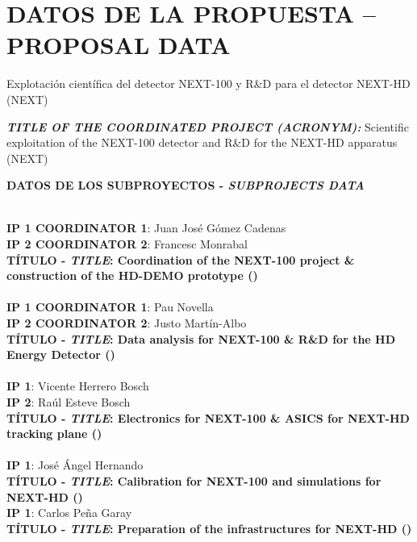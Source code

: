 \documentclass[a4paper,11pt,oneside, english]{article}
\begin{document}
	\section{\small DATOS DE LA PROPUESTA -- PROPOSAL DATA}
	\begin{tcolorbox}[colback=white,arc=0pt,outer arc=0pt,colframe=black,boxrule=0.6pt,left=0mm,right=0mm]
 Explotación científica del detector NEXT-100 y R\&D para el detector NEXT-HD (NEXT) 
\end{tcolorbox}
{\bf \emph{TITLE OF THE COORDINATED PROJECT (ACRONYM):}} Scientific exploitation of the NEXT-100 detector and R\&D for the NEXT-HD apparatus (NEXT)
\vspace{3pt}
\begin{tcolorbox}[colback=white,arc=0pt,outer arc=0pt,colframe=black,boxrule=0.6pt,left=0mm]
  \textbf{DATOS DE LOS SUBPROYECTOS - \emph{SUBPROJECTS DATA}}
\end{tcolorbox}
\\
{\bf IP 1 COORDINATOR 1}: Juan Jos\'e G\'omez Cadenas\\
{\bf IP 2 COORDINATOR 2}: Francesc Monrabal\\
{\bf T\'ITULO - \emph{TITLE}: Coordination of the NEXT-100 project \& construction of the HD-DEMO prototype (\sDIPC)}\\
\\
{\bf IP 1 COORDINATOR 1}: Pau Novella\\
{\bf IP 2 COORDINATOR 2}: Justo Mart\'in-Albo\\
{\bf T\'ITULO - \emph{TITLE}: Data analysis for NEXT-100 \& R\&D for the HD Energy Detector  (\sIFIC)}\\
\\
{\bf IP 1}: Vicente Herrero Bosch\\
{\bf IP 2}: Ra\'ul Esteve Bosch\\
{\bf T\'ITULO - \emph{TITLE}: Electronics for NEXT-100 \& ASICS for NEXT-HD tracking plane (\sUPV)}\\
\\
{\bf IP 1}: Jos\'e \' Angel Hernando\\
{\bf T\'ITULO - \emph{TITLE}: Calibration for NEXT-100 and simulations for NEXT-HD (\sUSC)}
\\
{\bf IP 1}: Carlos Pe\~na Garay\\
{\bf T\'ITULO - \emph{TITLE}: Preparation of the infrastructures for NEXT-HD (\sLSC)}
\end{document}
